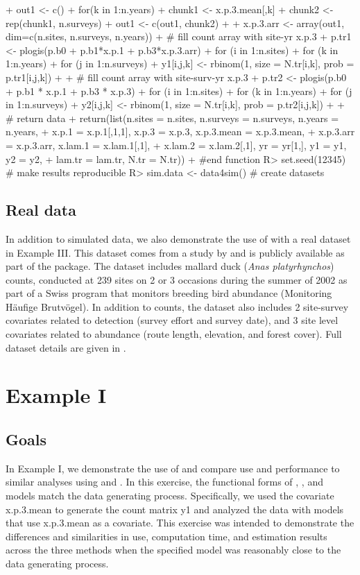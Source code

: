 \documentclass[article]{jss}
\begin{document}
\begin{Code}
{+  out1 <- c()
+  for(k in 1:n.years){
+   chunk1 <- x.p.3.mean[,k]
+   chunk2 <- rep(chunk1, n.surveys)
+   out1 <- c(out1, chunk2)
+  }
+  x.p.3.arr <- array(out1, dim=c(n.sites, n.surveys, n.years))
+  # fill count array with site-yr x.p.3
+  p.tr1 <- plogis(p.b0 + p.b1*x.p.1 + p.b3*x.p.3.arr)
+  for (i in 1:n.sites){
+    for (k in 1:n.years){
+      for (j in 1:n.surveys){
+        y1[i,j,k] <- rbinom(1, size = N.tr[i,k], prob = p.tr1[i,j,k])
+  }}}
+  # fill count array with site-surv-yr x.p.3
+  p.tr2 <- plogis(p.b0 + p.b1 * x.p.1 + p.b3 * x.p.3)
+  for (i in 1:n.sites){
+    for (k in 1:n.years){
+      for (j in 1:n.surveys){
+        y2[i,j,k] <- rbinom(1, size = N.tr[i,k], prob = p.tr2[i,j,k])
+  }}}
+  # return data
+  return(list(n.sites = n.sites, n.surveys = n.surveys, n.years = n.years,
+              x.p.1 = x.p.1[,1,1], x.p.3 = x.p.3, x.p.3.mean = x.p.3.mean,
+              x.p.3.arr = x.p.3.arr, x.lam.1 = x.lam.1[,1],
+              x.lam.2 = x.lam.2[,1], yr = yr[1,], y1 = y1, y2 = y2,
+              lam.tr = lam.tr, N.tr = N.tr))
+  } #end function
R> set.seed(12345) # make results reproducible
R> sim.data <- data4sim() # create datasets
\end{Code}

\subsection[Real data]{Real data}
In addition to simulated data, we also demonstrate the use of  with a real dataset in Example III. This dataset comes from a study by \cite{Kery_Royle_Schmid_2005} and is publicly available as part of the  package. The dataset includes mallard duck (\emph{Anas platyrhynchos}) counts, conducted at 239 sites on 2 or 3 occasions during the summer of 2002 as part of a Swiss program that monitors breeding bird abundance (Monitoring H\"{a}ufige Brutv\"{o}gel). In addition to counts, the dataset also includes 2 site-survey covariates related to detection (survey effort and survey date), and 3 site level covariates related to abundance (route length, elevation, and forest cover). Full dataset details are given in \cite{Kery_Royle_Schmid_2005}.

\section[Example I]{Example I}
\subsection[Goals]{Goals}
In Example I, we demonstrate the use of  and compare use and performance to similar analyses using  and . In this exercise, the functional forms of , , and  models match the data generating process.  Specifically, we used the covariate x.p.3.mean to generate the count matrix y1 and analyzed the data with models that use x.p.3.mean as a covariate. This exercise was intended to demonstrate the differences and similarities in use, computation time, and estimation results across the three methods when the specified model was reasonably close to the data generating process.
\end{document}
